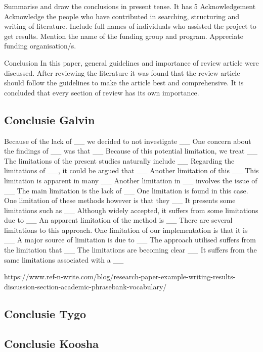 \documentclass{article}
\begin{document}
		Summarise and draw the conclusions in present tense. It has 5%
		Acknowledgement
		Acknowledge the people who have contributed in searching, structuring and writing of literature. Include full names of individuals who assisted the project to get results. Mention the name of the funding group and program. 
		Appreciate funding organisation/s.
		
		
		
		Conclusion
		In this paper, general guidelines and importance of review 
		article were discussed. After reviewing the literature it was found that the review article should follow the guidelines to make the article best and comprehensive. It is concluded that every section of review has its own importance.
		
		
		\subsection{Conclusie Galvin}
		
		Because of the lack of __ we decided to not investigate __
		One concern about the findings of __ was that __
		Because of this potential limitation, we treat __
		The limitations of the present studies naturally include __
		Regarding the limitations of __, it could be argued that __
		Another limitation of this __
		This limitation is apparent in many __
		Another limitation in __ involves the issue of __
		The main limitation is the lack of __
		One limitation is found in this case.
		One limitation of these methods however is that they __
		It presents some limitations such as __
		Although widely accepted, it suffers from some limitations due to __
		An apparent limitation of the method is __
		There are several limitations to this approach.
		One limitation of our implementation is that it is __
		A major source of limitation is due to  __
		The approach utilised suffers from the limitation that __
		The limitations are becoming clear __
		It suffers from the same limitations associated with a __
		
		https://www.ref-n-write.com/blog/research-paper-example-writing-results-discussion-section-academic-phrasebank-vocabulary/
		
		\subsection{Conclusie Tygo}
		
		\subsection{Conclusie Koosha}
		
\end{document}
